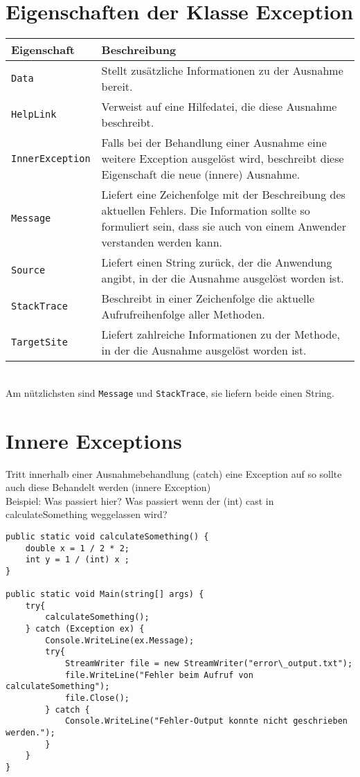 \section{Eigenschaften der Klasse Exception}

\begin{tabular}{L{.25} L{.75}}
Eigenschaft  & Beschreibung \\\hline
\lstinline$Data$ & Stellt zusätzliche Informationen zu der Ausnahme bereit.\\
\lstinline$HelpLink$ & Verweist auf eine Hilfedatei, die diese Ausnahme beschreibt.\\
\lstinline$InnerException$ & Falls bei der Behandlung einer Ausnahme eine weitere Exception ausgelöst wird, beschreibt diese Eigenschaft die neue (innere) Ausnahme. \\
\lstinline$Message$ & Liefert eine Zeichenfolge mit der Beschreibung des aktuellen Fehlers. Die Information sollte so formuliert sein, dass sie auch von einem Anwender verstanden werden kann. \\
\lstinline$Source$ & Liefert einen String zurück, der die Anwendung angibt, in der die Ausnahme ausgelöst worden ist. \\
\lstinline$StackTrace$ & Beschreibt in einer Zeichenfolge die aktuelle Aufrufreihenfolge aller Methoden.\\
\lstinline$TargetSite$ & Liefert zahlreiche Informationen zu der Methode, in der die Ausnahme ausgelöst worden ist. \\
\end{tabular}\\
Am nützlichsten sind \lstinline$Message$ und \lstinline$StackTrace$, sie liefern beide einen String.

\section{Innere Exceptions}
Tritt innerhalb einer Ausnahmebehandlung (catch) eine Exception auf so sollte auch diese Behandelt werden (innere Exception)\bigskip\\
Beispiel: Was passiert hier?  Was passiert wenn der (int) cast in calculateSomething weggelassen wird?
\begin{lstlisting}[language={[Sharp]C}]
public static void calculateSomething() {
	double x = 1 / 2 * 2;
	int y = 1 / (int) x ;
}

public static void Main(string[] args) {
	try{
		calculateSomething();
	} catch (Exception ex) {
		Console.WriteLine(ex.Message);
		try{
			StreamWriter file = new StreamWriter("error\_output.txt");
			file.WriteLine("Fehler beim Aufruf von calculateSomething");
			file.Close();  
		} catch {
			Console.WriteLine("Fehler-Output konnte nicht geschrieben werden.");
		}
	}
}
\end{lstlisting}
